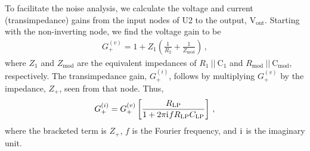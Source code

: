\documentclass[aip,rsi,reprint]{revtex4-1} %
\newcommand{\iu}{\mathrm{i}\mkern1mu}
\begin{document}
To facilitate the noise analysis, we calculate the voltage and current (transimpedance) gains from the input nodes of U2 to the output, $\text{V}_\text{out}$.
Starting with the non-inverting node, we find the voltage gain to be
\begin{align}
G_{+}^{(v)} = 1 + Z_1\left(\frac{1}{R_2} + \frac{1}{Z_\text{mod}}\right)\,,
\end{align}
where $Z_1$ and $Z_\text{mod}$ are the equivalent impedances of $R_1~||~\text{C}_1$ and $R_\text{mod}~||~\text{C}_\text{mod}$, respectively.
The transimpedance gain, $G^{(i)}_{+}$, follows by multiplying $G_+^{(v)}$ by the impedance, $Z_+$, seen from that node. %
Thus,
\begin{align}
G_{+}^{(i)} = G_{+}^{(v)}\left[\frac{R_\text{LP}}{1+2\pi \iu f R_\text{LP} C_\text{LP}}\right]\,,
\end{align}
where the bracketed term is $Z_+$, $f$ is the Fourier frequency, and $\iu$ is the imaginary unit.
 
\end{document}
